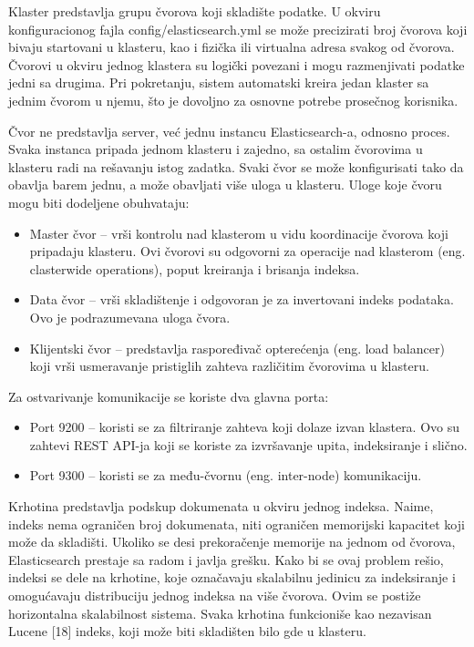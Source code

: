 \par
Klaster predstavlja grupu čvorova koji skladište podatke. U okviru konfiguracionog fajla config/elasticsearch.yml se može precizirati broj čvorova koji bivaju startovani u klasteru, kao i fizička ili virtualna adresa svakog od čvorova. Čvorovi u okviru jednog klastera su logički povezani i mogu razmenjivati podatke jedni sa drugima. Pri pokretanju, sistem automatski kreira jedan klaster sa jednim čvorom u njemu, što je dovoljno za osnovne potrebe prosečnog korisnika.

\par
Čvor ne predstavlja server, već jednu instancu Elasticsearch-a, odnosno proces. Svaka instanca pripada jednom klasteru i zajedno, sa ostalim čvorovima u klasteru radi na rešavanju istog zadatka. Svaki čvor se može konfigurisati tako da obavlja barem jednu, a može obavljati više uloga u klasteru. Uloge koje čvoru mogu biti dodeljene obuhvataju:
\begin{itemize}
\item Master čvor – vrši kontrolu nad klasterom u vidu koordinacije čvorova koji pripadaju klasteru. Ovi čvorovi su odgovorni za operacije nad klasterom (eng. clasterwide operations), poput kreiranja i brisanja indeksa.
\item Data čvor – vrši skladištenje i odgovoran je za invertovani indeks podataka. Ovo je podrazumevana uloga čvora.
\item Klijentski čvor – predstavlja raspoređivač opterećenja (eng. load balancer) koji vrši usmeravanje pristiglih zahteva različitim čvorovima u klasteru.
\end{itemize}

\par
Za ostvarivanje komunikacije se koriste dva glavna porta:
\begin{itemize}
    \item Port 9200 – koristi se za filtriranje zahteva koji dolaze izvan klastera. Ovo su zahtevi REST API-ja koji se koriste za izvršavanje upita, indeksiranje i slično.
    \item Port 9300 – koristi se za među-čvornu (eng. inter-node) komunikaciju.
\end{itemize}

\par
Krhotina predstavlja podskup dokumenata u okviru jednog indeksa. Naime, indeks nema ograničen broj dokumenata, niti ograničen memorijski kapacitet koji može da skladišti. Ukoliko se desi prekoračenje memorije na jednom od čvorova, Elasticsearch prestaje sa radom i javlja grešku. Kako bi se ovaj problem rešio, indeksi se dele na krhotine, koje označavaju skalabilnu jedinicu za indeksiranje i omogućavaju distribuciju jednog indeksa na više čvorova. Ovim se postiže horizontalna skalabilnost sistema. Svaka krhotina funkcioniše kao nezavisan Lucene [18] indeks, koji može biti skladišten bilo gde u klasteru.

